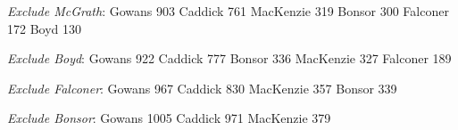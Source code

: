 \begin{resultsiii}
\emph{Exclude McGrath}: Gowans 903 Caddick 761 MacKenzie 319 Bonsor 300 Falconer 172 Boyd 130

\emph{Exclude Boyd}: Gowans 922 Caddick 777 Bonsor 336 MacKenzie 327 Falconer 189

\emph{Exclude Falconer}: Gowans 967 Caddick 830 MacKenzie 357 Bonsor 339

\emph{Exclude Bonsor}: Gowans 1005 Caddick 971 MacKenzie 379


\end{resultsiii}
